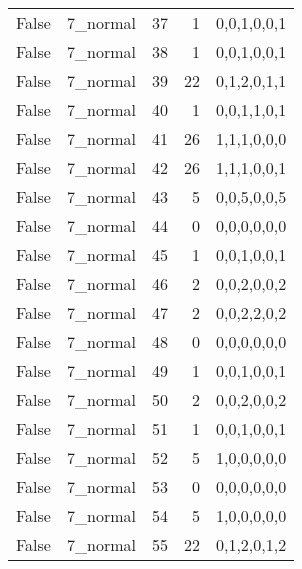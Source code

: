 \begin{tabular}{llrrl}
 False           & 7\_normal            &            37 &                     1 & 0,0,1,0,0,1   \\
 False           & 7\_normal            &            38 &                     1 & 0,0,1,0,0,1   \\
 False           & 7\_normal            &            39 &                    22 & 0,1,2,0,1,1   \\
 False           & 7\_normal            &            40 &                     1 & 0,0,1,1,0,1   \\
 False           & 7\_normal            &            41 &                    26 & 1,1,1,0,0,0   \\
 False           & 7\_normal            &            42 &                    26 & 1,1,1,0,0,1   \\
 False           & 7\_normal            &            43 &                     5 & 0,0,5,0,0,5   \\
 False           & 7\_normal            &            44 &                     0 & 0,0,0,0,0,0   \\
 False           & 7\_normal            &            45 &                     1 & 0,0,1,0,0,1   \\
 False           & 7\_normal            &            46 &                     2 & 0,0,2,0,0,2   \\
 False           & 7\_normal            &            47 &                     2 & 0,0,2,2,0,2   \\
 False           & 7\_normal            &            48 &                     0 & 0,0,0,0,0,0   \\
 False           & 7\_normal            &            49 &                     1 & 0,0,1,0,0,1   \\
 False           & 7\_normal            &            50 &                     2 & 0,0,2,0,0,2   \\
 False           & 7\_normal            &            51 &                     1 & 0,0,1,0,0,1   \\
 False           & 7\_normal            &            52 &                     5 & 1,0,0,0,0,0   \\
 False           & 7\_normal            &            53 &                     0 & 0,0,0,0,0,0   \\
 False           & 7\_normal            &            54 &                     5 & 1,0,0,0,0,0   \\
 False           & 7\_normal            &            55 &                    22 & 0,1,2,0,1,2   \\

\end{tabular}
